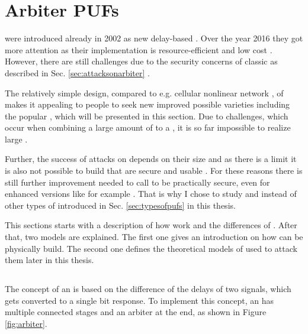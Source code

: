 \chapter{Arbiter \acsp{PUF}}
\label{cap:arbiter}

\apufs were introduced already in 2002 as new delay-based \puf \cite{Gassend2002SiliconFunctions}.
Over the year 2016 they got more attention as their implementation is resource-efficient and low cost \cite{Becker2014ActiveDesigns,Suh2007PhysicalGeneration}.
However, there are still challenges due to the security concerns of classic \apufs as described in Sec. \ref{sec:attacksonarbiter} \cite{Ganji2016PACPUFs, Ruhrmair2014PUFOverview}.

The relatively simple design, compared to e.g. cellular nonlinear network \pufs, of \apufs makes it appealing to people to seek new improved possible varieties including the popular \xpuf, which will be presented in this section. %
Due to challenges, which occur when combining a large amount of \apufs to a \xpufs, it is so far impossible to realize large \xpufs \cite{Rostami2014RobustMatching}.

Further, the success of attacks on \xpufs depends on their size and as there is a limit it is also not possible to build \xpufs that are secure and usable \cite{Ganji2015WhyPUFs}. %
For these reasons there is still further improvement needed to call \apufs to be practically secure, even for enhanced versions like for example \xpufs.
That is why I chose to study \apufs and \xpufs instead of other types of \pufs introduced in Sec. \ref{sec:typesofpufs} in this thesis.

This sections starts with a description of how \apufs work and the differences of \xpufs.
After that, two models are explained. %
The first one gives an introduction on how \apufs can be physically build.
The second one defines the theoretical models of \apufs used to attack them later in this thesis.

\section{\apufs}
\label{sec:arbiter}

The concept of an \apufs is based on the difference of the delays of two signals, which gets converted to a single bit response. 
To implement this concept, an \apuf has multiple connected stages and an arbiter at the end, as shown in Figure \ref{fig:arbiter}.

